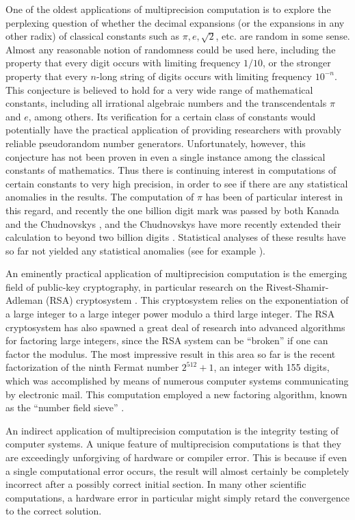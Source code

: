 One of the oldest applications of multiprecision computation is to
explore the perplexing question of whether the decimal expansions (or
the expansions in any other radix) of classical constants such as
$\pi, e, \sqrt{2}$, etc. are random in some sense.  Almost any
reasonable notion of randomness could be used here, including the
property that every digit occurs with limiting frequency $1 / 10$, or
the stronger property that every $n$-long string of digits occurs with
limiting frequency $10^{-n}$.  This conjecture is believed to hold for
a very wide range of mathematical constants, including all irrational
algebraic numbers and the transcendentals $\pi$ and $e$, among others.
Its verification for a certain class of constants would potentially
have the practical application of providing researchers with provably
reliable pseudorandom number generators.  Unfortunately, however, this
conjecture has not been proven in even a single instance among the
classical constants of mathematics.  Thus there is continuing interest
in computations of certain constants to very high precision, in order
to see if there are any statistical anomalies in the results.  The
computation of $\pi$ has been of particular interest in this regard,
and recently the one billion digit mark was passed by both Kanada
\cite{kanada} and the Chudnovskys \cite{chud1}, and the Chudnovskys
have more recently extended their calculation to beyond two billion
digits \cite{chud2}.  Statistical analyses of these results have so
far not yielded any statistical anomalies (see for example
\cite{dhb2}).

An eminently practical application of multiprecision computation is
the emerging field of public-key cryptography, in particular research
on the Rivest-Shamir-Adleman (RSA) cryptosystem \cite{rsa,comba}.
This cryptosystem relies on the exponentiation of a large integer to a
large integer power modulo a third large integer.  The RSA
cryptosystem has also spawned a great deal of research into advanced
algorithms for factoring large integers, since the RSA system can be
``broken'' if one can factor the modulus.  The most impressive result
in this area so far is the recent factorization of the ninth Fermat
number $2^{512} + 1$, an integer with 155 digits, which was
accomplished by means of numerous computer systems communicating by
electronic mail.  This computation employed a new factoring algorithm,
known as the ``number field sieve'' \cite{lenstra}.

An indirect application of multiprecision computation is the integrity
testing of computer systems.  A unique feature of multiprecision
computations is that they are exceedingly unforgiving of hardware or
compiler error.  This is because if even a single computational error
occurs, the result will almost certainly be completely incorrect after
a possibly correct initial section.  In many other scientific
computations, a hardware error in particular might simply retard the
convergence to the correct solution.

